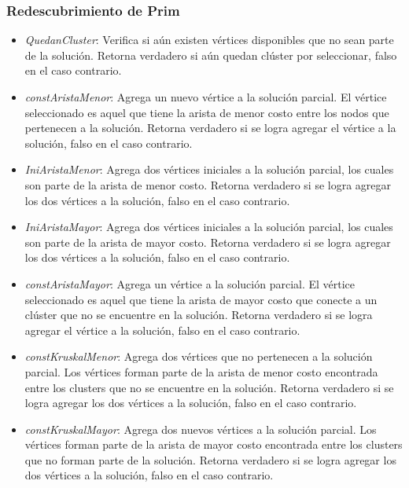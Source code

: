 \subsubsection*{Redescubrimiento de Prim}

\begin{itemize}

\item \textit{QuedanCluster}: Verifica si aún existen vértices disponibles que no sean parte de la solución. Retorna verdadero si aún quedan clúster por seleccionar, falso en el caso contrario.


\item \textit{constAristaMenor}: Agrega un nuevo vértice a la solución parcial. El vértice seleccionado es aquel que tiene la arista de menor costo entre los nodos que pertenecen a la solución. Retorna verdadero si se logra agregar el  vértice a la solución, falso en el caso contrario.

\item \textit{IniAristaMenor}: Agrega dos vértices iniciales a la solución parcial, los cuales son parte de la arista de menor costo. Retorna verdadero si se logra agregar los dos vértices a la solución, falso en el caso contrario.

\item \textit{IniAristaMayor}: Agrega dos vértices iniciales a la solución parcial, los cuales son parte de la arista de mayor costo. Retorna verdadero si se logra agregar los dos vértices a la solución, falso en el caso contrario.

\item \textit{constAristaMayor}: Agrega un vértice a la solución parcial. El vértice seleccionado es aquel que tiene la arista de mayor costo que conecte a un clúster que no se encuentre en la solución. Retorna verdadero si se logra agregar el  vértice a la solución, falso en el caso contrario.

\item \textit{constKruskalMenor}: Agrega dos vértices que no pertenecen a la solución parcial. Los vértices forman parte de la arista de menor costo encontrada entre los clusters que no se encuentre en la solución. Retorna verdadero si se logra agregar los dos vértices a la solución, falso en el caso contrario.

\item \textit{constKruskalMayor}: Agrega dos nuevos vértices a la solución parcial. Los vértices forman parte de la arista de mayor costo encontrada entre los clusters que no forman parte de la solución. Retorna verdadero si se logra agregar los dos vértices a la solución, falso en el caso contrario.

\end{itemize}

